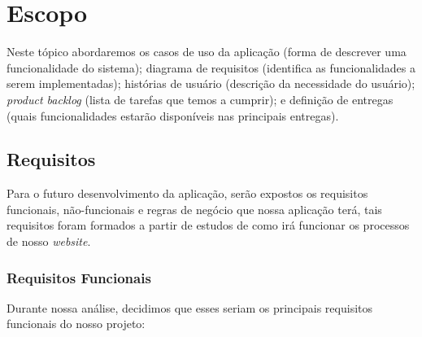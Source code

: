 \section{Escopo}

Neste tópico abordaremos os casos de uso da aplicação (forma de descrever uma
funcionalidade do sistema); diagrama de requisitos (identifica as funcionalidades a serem
implementadas); histórias de usuário (descrição da necessidade do usuário); \emph{product
backlog} (lista de tarefas que temos a cumprir); e definição de entregas (quais funcionalidades estarão
disponíveis nas principais entregas).
\subsection{Requisitos}

Para o futuro desenvolvimento da aplicação, serão expostos os requisitos funcionais, não-funcionais e regras de negócio que nossa aplicação terá, tais requisitos foram formados a partir de estudos de como irá funcionar os processos de nosso \emph{website}.

\subsubsection{Requisitos Funcionais}

Durante nossa análise, decidimos que esses seriam os principais requisitos funcionais do nosso projeto:

